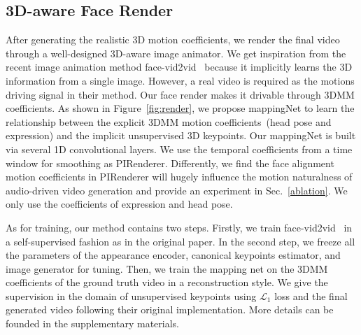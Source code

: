 \subsection{3D-aware Face Render}
\label{sec:render}
After generating the realistic 3D motion coefficients, we render the final video through a well-designed 3D-aware image animator. We get inspiration from the recent image animation method face-vid2vid~\cite{facevid2vid} because it implicitly learns the 3D information from a single image. 
However, a real video is required as the motions driving signal in their method. Our face render makes it 
 drivable through 3DMM coefficients.
As shown in Figure~\ref{fig:render}, we propose mappingNet to learn the relationship between the explicit 3DMM motion coefficients~(head pose and expression) and the implicit unsupervised 3D keypoints. Our mappingNet is built via several 1D convolutional layers. We use the temporal coefficients from a time window for smoothing as PIRenderer\cite{ren2021pirenderer}. Differently, we find the face alignment motion coefficients in PIRenderer will hugely influence the motion naturalness of audio-driven video generation and provide an experiment in Sec.~\ref{ablation}. We only use the coefficients of expression and head pose.



As for training, our method contains two steps. Firstly, we train face-vid2vid~\cite{facevid2vid} in a self-supervised fashion as in the original paper. In the second step, we freeze all the parameters of the appearance encoder, canonical keypoints estimator, and image generator for tuning. Then, we train the mapping net on the 3DMM coefficients of the ground truth video in a reconstruction style. We give the supervision in the domain of unsupervised keypoints using $\mathcal{L}_1$ loss and the final generated video following their original implementation. More details can be founded in the supplementary materials.

